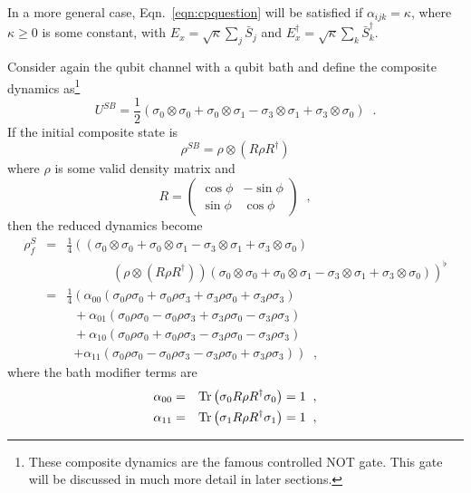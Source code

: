In a more general case, Eqn.\ \ref{eqn:cpquestion} will be satisfied if $\alpha_{ijk} = \kappa$, where $\kappa\ge 0$ is some constant, with $E_x = \sqrt{\kappa} \sum_j \bar{S}_j$ and $E_x^\dagger = \sqrt{\kappa}\sum_k \bar{S}_k^\dagger$.  
\begin{example}
Consider again the qubit channel with a qubit bath and define the composite dynamics as\footnote{These composite dynamics are the famous controlled NOT gate.  This gate will be discussed in much more detail in later sections.}
$$
U^{SB} = \frac{1}{2}\left(\sigma_0\otimes\sigma_0 + \sigma_0\otimes\sigma_1 - \sigma_3\otimes\sigma_1 + \sigma_3\otimes\sigma_0\right)\;\;.
$$
If the initial composite state is
$$
\rho^{SB} = \rho\otimes \left(R\rho R^\dagger\right)
$$
where $\rho$ is some valid density matrix and 
$$
R = \begin{pmatrix}
\cos{\phi}&-\sin{\phi}\\
\sin{\phi}&\cos{\phi}
\end{pmatrix}\;\;,
$$
then the reduced dynamics become
\begin{eqnarray*}
\rho^S_f &=& \frac{1}{4}\left( \left( \sigma_0\otimes\sigma_0 + \sigma_0\otimes\sigma_1 - \sigma_3\otimes\sigma_1 + \sigma_3\otimes\sigma_0\right)\right.\\
& &\;\;\;\;\;\;\;\;\;\;\;\;\;\left.\left( \rho\otimes \left(R\rho R^\dagger\right)\right)\left(\sigma_0\otimes\sigma_0 + \sigma_0\otimes\sigma_1 - \sigma_3\otimes\sigma_1 + \sigma_3\otimes\sigma_0\right)\right)^\flat\\
&=& \frac{1}{4}\left( \alpha_{00} \left(\sigma_0\rho\sigma_0 + \sigma_0\rho\sigma_3 + \sigma_3\rho\sigma_0 + \sigma_3\rho\sigma_3\right)\right.\\
& &\;\;+ \alpha_{01} \left( \sigma_0\rho\sigma_0 - \sigma_0\rho\sigma_3 + \sigma_3\rho\sigma_0 - \sigma_3\rho\sigma_3\right)\\
& &\;\; + \alpha_{10}\left( \sigma_0\rho\sigma_0 +\sigma_0\rho\sigma_3 - \sigma_3\rho\sigma_0 - \sigma_3\rho\sigma_3 \right) \\
& &\;\;\left.+ \alpha_{11}\left( \sigma_0\rho\sigma_0 - \sigma_0\rho\sigma_3 - \sigma_3\rho\sigma_0 +\sigma_3\rho\sigma_3 \right) \right)\;\;,
\end{eqnarray*}
where the bath modifier terms are
\begin{eqnarray*}
\alpha_{00} &=& \trace\left( \sigma_0 R \rho R^\dagger \sigma_0 \right) = 1\;\;,\\
\alpha_{11} &=& \trace\left( \sigma_1 R \rho R^\dagger \sigma_1 \right) = 1\;\;,\\

\end{eqnarray*}
\end{example}
